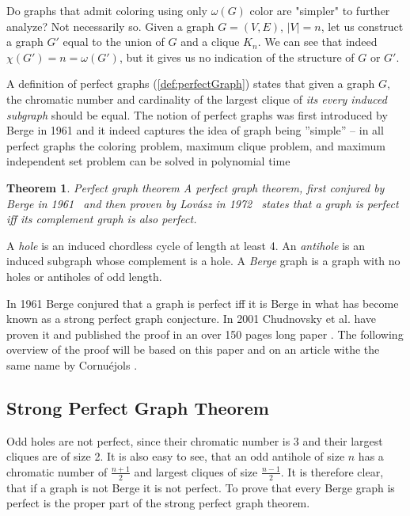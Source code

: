 \documentclass{article}
\newtheorem{theorem}{Theorem}[section]
\newcommand\Lovasz{Lovász }
\begin{document}
Do graphs that admit coloring using only $\omega(G)$ color are "simpler" to further analyze? Not necessarily so. Given a graph $G = (V, E)$, $|V| = n$, let us construct a graph $G'$ equal to the union of $G$ and a clique $K_n$. We can see that indeed $\chi(G') = n = \omega(G')$, but it gives us no indication of the structure of $G$ or $G'$.

A definition of perfect graphs (\cref{def:perfectGraph}) states that given a graph $G$, the chromatic number and cardinality of the largest clique of \emph{its every induced subgraph} should be equal. The notion of perfect graphs was first introduced by Berge in 1961 \cite{CB61} and it indeed captures the idea of graph being ''simple'' -- in all perfect graphs the coloring problem, maximum clique problem, and maximum independent set problem can be solved in polynomial time \cite{grotschel1993}

\begin{theorem}{Perfect graph theorem}
A perfect graph theorem, first conjured by Berge in 1961~\cite{CB61} and then proven by \Lovasz in 1972~\cite{LL72} states that a graph is perfect iff its complement graph is also perfect. 
\end{theorem}

A \emph{hole} is an induced chordless cycle of length at least 4. An \emph{antihole} is an induced subgraph whose complement is a hole. A \emph{Berge} graph is a graph with no holes or antiholes of odd length.

In 1961 Berge conjured that a graph is perfect iff it is Berge in what has become known as a strong perfect graph conjecture. In 2001 Chudnovsky et al. have proven it and published the proof in an over 150 pages long paper  \cite{MC06}. The following overview of the proof will be based on this paper and on an article withe the same name by Cornuéjols \cite{GC03}.

\subsection{Strong Perfect Graph Theorem}

Odd holes are not perfect, since their chromatic number is 3 and their largest cliques are of size 2. It is also easy to see, that an odd antihole of size $n$ has a chromatic number of $\frac{n+1}{2}$ and largest cliques of size $\frac{n-1}{2}$. It is therefore clear, that if a graph is not Berge it is not perfect. To prove that every Berge graph is perfect is the proper part of the strong perfect graph theorem.
\end{document}
